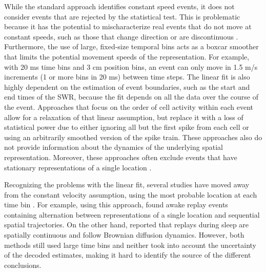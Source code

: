 \documentclass[9pt,lineno]{elife}
\begin{document}
While the standard approach identifies constant speed events, it does not consider events that are rejected by the statistical test. This is problematic because it has the potential to mischaracterize real events that do not move at constant speeds, such as those that change direction or are discontinuous \citep{LiuMethodsAssessmentMemory2018}. Furthermore, the use of large, fixed-size temporal bins acts as a boxcar smoother that limits the potential movement speeds of the representation. For example, with 20 ms time bins and 3 cm position bins, an event can only move in 1.5 m/s increments (1 or more bins in 20 ms) between time steps. The linear fit is also highly dependent on the estimation of event boundaries, such as the start and end times of the SWR, because the fit depends on all the data over the course of the event. Approaches that focus on the order of cell activity within each event \citep{LeeMemorySequentialExperience2002, GuptaHippocampalReplayNot2010} allow for a relaxation of that linear assumption, but replace it with a loss of statistical power due to either ignoring all but the first spike from each cell or using an arbitrarily smoothed version of the spike train. These approaches also do not provide information about the dynamics of the underlying spatial representation. Moreover, these approaches often exclude events that have stationary representations of a single location \citep{YuDistincthippocampalcorticalmemory2017, FarooqEmergencepreconfiguredplastic2019}. 

Recognizing the problems with the linear fit, several studies have moved away from the constant velocity assumption, using the most probable location at each time bin \citep{PfeifferHippocampalplacecellsequences2013, WuHippocampalReplayCaptures2014, GrosmarkDiversityneuralfiring2016, CareyRewardrevaluationbiases2019,  KaeferReplayBehavioralSequences2020}. For example, using this approach, \cite{PfeifferAutoassociativedynamicsgeneration2015} found awake replay events containing alternation between representations of a single location and sequential spatial trajectories. On the other hand, \cite{StellaHippocampalReactivationRandom2019} reported that replays during sleep are spatially continuous and follow Brownian diffusion dynamics. However, both methods still used large time bins and neither took into account the uncertainty of the decoded estimates, making it hard to identify the source of the different conclusions.
\end{document}
